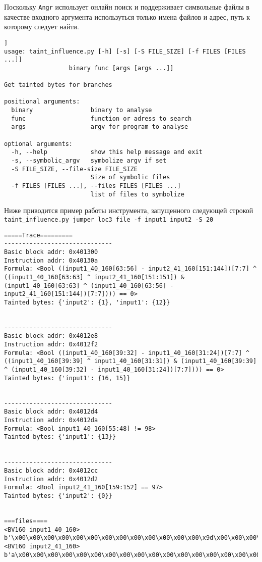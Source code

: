 Поскольку \texttt{Angr} использует онлайн поиск и поддерживает символьные файлы в качестве входного аргумента используться только имена файлов и адрес, путь к которому следует найти.

\begin{lstlisting}[caption=Интерфейс инструмента основанного на angr, captionpos=b]]
usage: taint_influence.py [-h] [-s] [-S FILE_SIZE] [-f FILES [FILES ...]]
                  binary func [args [args ...]]

Get tainted bytes for branches

positional arguments:
  binary                binary to analyse
  func                  function or adress to search
  args                  argv for program to analyse

optional arguments:
  -h, --help            show this help message and exit
  -s, --symbolic_argv   symbolize argv if set
  -S FILE_SIZE, --file-size FILE_SIZE
                        Size of symbolic files
  -f FILES [FILES ...], --files FILES [FILES ...]
                        list of files to symbolize
\end{lstlisting}

Ниже приводится пример работы инструмента, запущенного следующей строкой \texttt{taint\_influence.py jumper loc3 file -f input1 input2 -S 20}

\begin{lstlisting}[caption=Пример работы инструмента,captionpos=b]
=====Trace=========
------------------------------
Basic block addr: 0x401300
Instruction addr: 0x40130a
Formula: <Bool ((input1_40_160[63:56] - input2_41_160[151:144])[7:7] ^ ((input1_40_160[63:63] ^ input2_41_160[151:151]) & (input1_40_160[63:63] ^ (input1_40_160[63:56] - input2_41_160[151:144])[7:7]))) == 0>
Tainted bytes: {'input2': {1}, 'input1': {12}}


------------------------------
Basic block addr: 0x4012e8
Instruction addr: 0x4012f2
Formula: <Bool ((input1_40_160[39:32] - input1_40_160[31:24])[7:7] ^ ((input1_40_160[39:39] ^ input1_40_160[31:31]) & (input1_40_160[39:39] ^ (input1_40_160[39:32] - input1_40_160[31:24])[7:7]))) == 0>
Tainted bytes: {'input1': {16, 15}}


------------------------------
Basic block addr: 0x4012d4
Instruction addr: 0x4012da
Formula: <Bool input1_40_160[55:48] != 98>
Tainted bytes: {'input1': {13}}


------------------------------
Basic block addr: 0x4012cc
Instruction addr: 0x4012d2
Formula: <Bool input2_41_160[159:152] == 97>
Tainted bytes: {'input2': {0}}


===files====
<BV160 input1_40_160>
b'\x00\x00\x00\x00\x00\x00\x00\x00\x00\x00\x00\x00\x00\x9d\x00\x00\x00\x00\x00\x00'
<BV160 input2_41_160>
b'a\x00\x00\x00\x00\x00\x00\x00\x00\x00\x00\x00\x00\x00\x00\x00\x00\x00\x00\x00'
\end{lstlisting}

